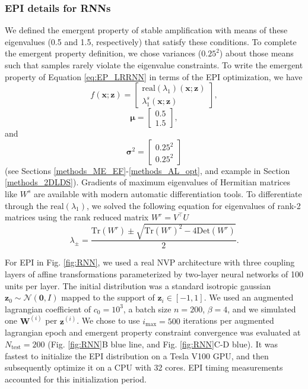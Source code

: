 \documentclass[11pt]{article}
\begin{document}
\subsubsection{EPI details for RNNs}
We defined the emergent property of stable amplification with means of these eigenvalues (0.5 and 1.5, respectively) that satisfy these conditions.
To complete the emergent property definition, we chose variances ($0.25^2$) about those means such that samples rarely violate the eigenvalue constraints.
To write the emergent property of Equation \ref{eq:EP_LRRNN} in terms of the EPI optimization, we have
\begin{equation} 
f(\mathbf{x}; \mathbf{z}) = \begin{bmatrix} \text{real}(\lambda_1)(\mathbf{x}; \mathbf{z}) \\ \lambda_1^s(\mathbf{x}; \mathbf{z})  \end{bmatrix},
\end{equation}
\begin{equation} 
\bm{\mu} = \begin{bmatrix} 0.5 \\ 1.5 \end{bmatrix},
\end{equation}
and
\begin{equation} 
\bm{\sigma}^2 = \begin{bmatrix} 0.25^2 \\ 0.25^2 \end{bmatrix}
\end{equation}
(see Sections \ref{methods_ME_EF}-\ref{methods_AL_opt}, and example in Section \ref{methods_2DLDS}).
Gradients of maximum eigenvalues of Hermitian matrices like $W^s$ are available with modern automatic differentiation tools.
To differentiate through the $\text{real}(\lambda_1)$, we solved the following equation for eigenvalues of rank-2 matrices using the rank reduced matrix $W^r = V^{\top} U$
\begin{equation}
\lambda_{\pm} = \frac{\text{Tr}(W^r) \pm \sqrt{\text{Tr}(W^r)^2 - 4\text{Det}(W^r)}}{2}.
\end{equation}

For EPI in Fig. \ref{fig:RNN}, we used a real NVP architecture with three coupling layers of affine transformations parameterized by two-layer neural networks of 100 units per layer.
The initial distribution was a standard isotropic gaussian $\mathbf{z}_0 \sim \mathcal{N}(\mathbf{0}, I)$ mapped to the support of $\mathbf{z}_i \in [-1, 1]$. 
We used an augmented lagrangian coefficient of $c_0 = 10^{3}$, a batch size $n=200$, $\beta=4$, and we simulated one $\mathbf{W}^{(i)}$ per $\mathbf{z}^{(i)}$.  We chose to use $i_{\text{max}} = 500$ iterations per augmented lagrangian epoch and emergent property constraint convergence was evaluated at $N_{\text{test}} = 200$ (Fig. \ref{fig:RNN}B blue line, and Fig. \ref{fig:RNN}C-D blue).
It was fastest to initialize the EPI distribution on a Tesla V100 GPU, and then subsequently optimize it on a CPU with 32 cores.
EPI timing measurements accounted for this initialization period.
\end{document}

